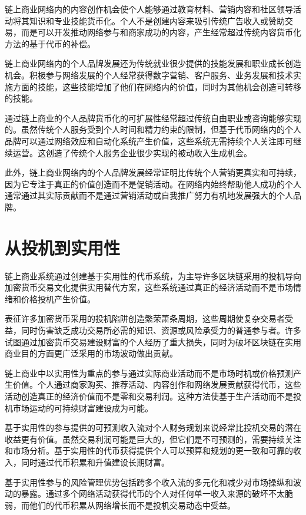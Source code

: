 \documentclass[
  Letterpaper,
]{scrbook}
\begin{document}
链上商业网络内的内容创作机会使个人能够通过教育材料、营销内容和社区领导活动将其知识和专业技能货币化。个人不是创建内容来吸引传统广告收入或赞助交易，而是可以开发推动网络参与和商家成功的内容，产生经常超过传统内容货币化方法的基于代币的补偿。

链上商业网络内的个人品牌发展还为传统就业很少提供的技能发展和职业成长创造机会。积极参与网络发展的个人经常获得数字营销、客户服务、业务发展和技术实施方面的技能，这些技能增加了他们在网络内的价值，同时为其他机会创造可转移的技能。

通过链上商业的个人品牌货币化的可扩展性经常超过传统自由职业或咨询能够实现的。虽然传统个人服务受到个人时间和精力约束的限制，但基于代币网络内的个人品牌可以通过网络效应和自动化系统产生价值，这些系统无需持续个人关注即可继续运营。这创造了传统个人服务企业很少实现的被动收入生成机会。

此外，链上商业网络内的个人品牌发展经常证明比传统个人营销更真实和可持续，因为它专注于真正的价值创造而不是促销活动。在网络内始终帮助他人成功的个人通常通过其实际贡献而不是通过营销活动或自我推广努力有机地发展强大的个人品牌。

\section{从投机到实用性}\label{ux4eceux6295ux673aux5230ux5b9eux7528ux6027}

链上商业系统通过创建基于实用性的代币系统，为主导许多区块链采用的投机导向加密货币交易文化提供实用替代方案，这些系统通过真正的经济活动而不是市场情绪和价格投机产生价值。

表征许多加密货币采用的投机陷阱创造繁荣萧条周期，这些周期使复杂交易者受益，同时伤害缺乏成功交易所必需的知识、资源或风险承受力的普通参与者。许多试图通过加密货币交易建设财富的个人经历了重大损失，同时为破坏区块链在实用商业目的方面更广泛采用的市场波动做出贡献。

链上商业中以实用性为重点的参与通过实际商业活动而不是市场时机或价格预测产生价值。个人通过商家购买、推荐活动、内容创作和网络发展贡献获得代币，这些活动创造真正的经济价值而不是零和交易利润。这种方法使基于生产活动而不是投机市场运动的可持续财富建设成为可能。

基于实用性的参与提供的可预测收入流对个人财务规划来说经常比投机交易的潜在收益更有价值。虽然交易利润可能是巨大的，但它们是不可预测的，需要持续关注和市场分析。基于实用性的代币获得提供个人可以预算和规划的更一致和可靠的收入，同时通过代币积累和升值建设长期财富。

基于实用性参与的风险管理优势包括跨多个收入流的多元化和减少对市场操纵和波动的暴露。通过多个网络活动获得代币的个人对任何单一收入来源的破坏不太脆弱，而他们的代币积累从网络增长而不是投机交易动态中受益。
\end{document}
